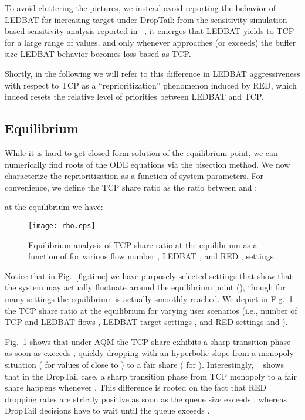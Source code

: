 \documentclass[conference]{IEEEtran}
\newcommand{\secL}[1]{\label{sec:#1}}
\newcommand{\figR}[1]{Fig.~\ref{fig:#1}}
\newcommand{\figLC}[2]{
		\caption{#2}
		\label{fig:#1}
}
\begin{document}
To avoid cluttering the pictures, we instead avoid reporting the behavior of LEDBAT for increasing target  under DropTail: from the sensitivity simulation-based sensitivity analysis reported in ~\cite{lcn10}, it emerges that
LEDBAT yields to TCP for a large range of  values, and only whenever  approaches (or exceeds) the buffer size  LEDBAT behavior becomes loss-based as TCP.

Shortly, in the following we will refer to this difference in LEDBAT aggressiveness with respect to TCP as a ``reprioritization'' phenomenon induced by RED, which indeed resets the relative level of priorities between LEDBAT and TCP.


\subsection{Equilibrium}\secL{equilibrium}

While it is hard to get closed form solution of the equilibrium point, we can numerically find roots of the ODE equations via the bisection method.
We now characterize the reprioritization as a function of system parameters. For convenience, we define the TCP share ratio as the ratio between  and : 


\noindent at the equilibrium we have:



\begin{figure}[t]
    \begin{center}
        \texttt{[image: rho.eps]}
        \figLC{rho}{Equilibrium analysis of TCP share ratio  at the equilibrium as a function of  for various flow number , LEDBAT , and RED ,  settings.}
    \end{center}
\end{figure}


Notice that in \figR{time} we have purposely selected settings that show that the system may actually fluctuate around the equilibrium point (), though for many settings the equilibrium is actually smoothly reached.
We depict in \figR{rho} the TCP share ratio  at the equilibrium for varying user scenarios (i.e., number of TCP and LEDBAT flows , LEDBAT target settings ,  and RED settings  and ). 

\figR{rho} shows that  under AQM the TCP share exhibits a sharp transition phase as soon as   exceeds , quickly dropping with an hyperbolic slope from a monopoly situation ( for values of  close to ) to a fair share ( for  ). 
Interestingly, ~\cite{lcn10} shows that in the DropTail case, a sharp transition phase from TCP monopoly to a fair share happens whenever .
This difference is rooted on the fact that RED dropping rates are strictly positive as soon as the queue size exceeds , whereas DropTail decisions have to wait until the queue exceeds . 
\end{document}
